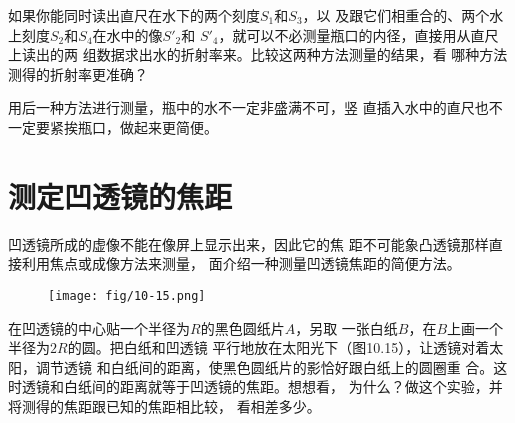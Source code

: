 如果你能同时读出直尺在水下的两个刻度$S_1$和$S_3$，以
及跟它们相重合的、两个水上刻度$S_2$和$S_4$在水中的像$S'_2$和
$S'_4$，就可以不必测量瓶口的内径，直接用从直尺上读出的两
组数据求出水的折射率来。比较这两种方法测量的结果，看
哪种方法测得的折射率更准确？

用后一种方法进行测量，瓶中的水不一定非盛满不可，竖
直插入水中的直尺也不一定要紧挨瓶口，做起来更简便。

\section{测定凹透镜的焦距}
凹透镜所成的虚像不能在像屏上显示出来，因此它的焦
距不可能象凸透镜那样直接利用焦点或成像方法来测量，
面介绍一种测量凹透镜焦距的简便方法。
\begin{figure}[htp]\centering
    \texttt{[image: fig/10-15.png]}
    \caption{}
    \end{figure}


在凹透镜的中心贴一个半径为$R$的黑色圆纸片$A$，另取
一张白纸$B$，在$B$上画一个半径为$2R$的圆。把白纸和凹透镜
平行地放在太阳光下（图10.15），让透镜对着太阳，调节透镜
和白纸间的距离，使黑色圆纸片的影恰好跟白纸上的圆圈重
合。这时透镜和白纸间的距离就等于凹透镜的焦距。想想看，
为什么？做这个实验，并将测得的焦距跟已知的焦距相比较，
看相差多少。















































































